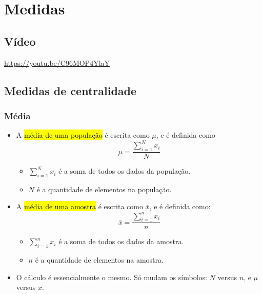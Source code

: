 \documentclass[
  11pt]{report}
\begin{document}
\hypertarget{medidas}{%
\chapter{Medidas}\label{medidas}}

\hypertarget{vuxeddeo}{%
\section{Vídeo}\label{vuxeddeo}}

\begin{center} \url{https://youtu.be/C96MOP4YlaY} \end{center}

\hypertarget{medidas-de-centralidade}{%
\section{Medidas de centralidade}\label{medidas-de-centralidade}}

\hypertarget{muxe9dia}{%
\subsection{Média}\label{muxe9dia}}

\begin{itemize}
\item
  A {\hl{média de uma população}} é escrita como $\mu$, e é definida como
  \[\mu = \frac{\sum_{i=1}^N x_i}{N}\]

  \begin{itemize}
  \item
    $\sum_{i=1}^N x_i$ é a soma de todos os dados da população.
  \item
    $N$ é a quantidade de elementos na população.
  \end{itemize}
\item
  A {\hl{média de uma amostra}} é escrita como $\bar x$, e é definida como:
  \[\bar x = \frac{\sum_{i=1}^n x_i}{n}\]

  \begin{itemize}
  \item
    $\sum_{i=1}^n x_i$ é a soma de todos os dados da amostra.
  \item
    $n$ é a quantidade de elementos na amostra.
  \end{itemize}
\item
  O cálculo é essencialmente o mesmo. Só mudam os símbolos: $N$ versus $n$, e $\mu$ versus $\bar x$.
\end{itemize}
\end{document}
